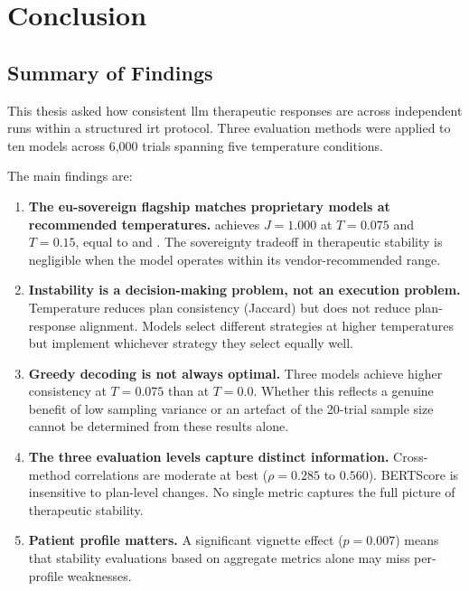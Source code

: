 \chapter{Conclusion}
\label{chap:conclusion}

\section{Summary of Findings}
\label{sec:concl-summary}

This thesis asked how consistent \gls{llm} therapeutic responses are
across independent runs within a structured \gls{irt} protocol. Three
evaluation methods were applied to ten models across 6{,}000 trials
spanning five temperature conditions.

The main findings are:

\begin{enumerate}
  \item \textbf{The \gls{eu}-sovereign flagship matches proprietary models
    at recommended temperatures.}  achieves
    $J = 1.000$ at $T = 0.075$ and $T = 0.15$, equal to 
    and . The sovereignty tradeoff in therapeutic
    stability is negligible when the model operates within its vendor-recommended
    range.

  \item \textbf{Instability is a decision-making problem, not an execution
    problem.} Temperature reduces plan consistency (Jaccard) but does not
    reduce plan-response alignment. Models select different strategies at
    higher temperatures but implement whichever strategy they select equally
    well.

  \item \textbf{Greedy decoding is not always optimal.} Three models achieve
    higher consistency at $T = 0.075$ than at $T = 0.0$. Whether this
    reflects a genuine benefit of low sampling variance or an artefact of
    the 20-trial sample size cannot be determined from these results alone.

  \item \textbf{The three evaluation levels capture distinct information.}
    Cross-method correlations are moderate at best ($\rho = 0.285$ to
    $0.560$). BERTScore is insensitive to plan-level changes. No single
    metric captures the full picture of therapeutic stability.

  \item \textbf{Patient profile matters.} A significant vignette effect
    ($p = 0.007$) means that stability evaluations based on aggregate
    metrics alone may miss per-profile weaknesses.
\end{enumerate}

